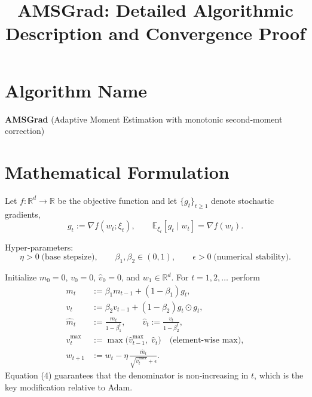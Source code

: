 \documentclass{article}
\begin{document}
\title{AMSGrad: Detailed Algorithmic Description and Convergence Proof}
\author{}
\date{}
\maketitle

\section*{Algorithm Name}
\textbf{AMSGrad} (Adaptive Moment Estimation with monotonic second‑moment correction)

\section*{Mathematical Formulation}
Let $f:\mathbb{R}^d\rightarrow\mathbb{R}$ be the objective function and let
$\{g_t\}_{t\ge 1}$ denote stochastic gradients,
\[
g_t := \nabla f(w_t;\xi_t),\qquad \mathbb{E}_{\xi_t}[g_t\mid w_t]=\nabla f(w_t).
\]

Hyper‑parameters:
\[
\eta>0\;\text{(base stepsize)},\qquad 
\beta_1,\beta_2\in(0,1),\qquad 
\epsilon>0\;\text{(numerical stability)}.
\]

Initialize $m_0=0$, $v_0=0$, $\widehat v_0=0$, and $w_1\in\mathbb{R}^d$.
For $t=1,2,\dots$ perform
\begin{align}
m_t &:= \beta_1 m_{t-1} + (1-\beta_1) g_t, \tag{1}\\
v_t &:= \beta_2 v_{t-1} + (1-\beta_2) g_t\odot g_t, \tag{2}\\
\widehat m_t &:= \frac{m_t}{1-\beta_1^{t}},\qquad 
\widehat v_t := \frac{v_t}{1-\beta_2^{t}}, \tag{3}\\
\widehat v_t^{\text{max}} &:= \max\bigl(\widehat v_{t-1}^{\text{max}},\;\widehat v_t\bigr) \quad\text{(element‑wise max)}, \tag{4}\\
w_{t+1} &:= w_t - \eta\,
\frac{\widehat m_t}{\sqrt{\widehat v_t^{\text{max}}}+\epsilon}. \tag{5}
\end{align}
Equation (4) guarantees that the denominator is non‑increasing in $t$,
which is the key modification relative to Adam.

\end{document}
